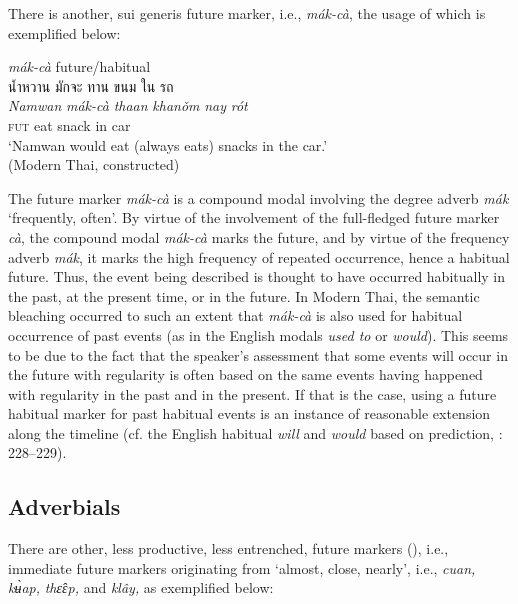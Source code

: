 \documentclass[output=paper,colorlinks,citecolor=brown]{langscibook}
\begin{document}
There is another, sui generis future marker, i.e., \textit{mák-cà}, the usage of which is exemplified below: 

\ea \label{ex:9}
    \textit{mák-cà }future/habitual\\
    \textthai{น้ำหวาน} \textthai{มักจะ} \textthai{ทาน} \textthai{ขนม} \textthai{ใน} \textthai{รถ}\\
    \gll \textit{Namwan} \textit{mák-cà} \textit{thaan} \textit{khanǒm} \textit{nay} \textit{rót}\\
    [name] \textsc{fut} eat snack in car\\
    \glt ‘Namwan would eat (always eats) snacks in the car.’ \\
    \hfill (Modern Thai, constructed)
\z

The future marker \textit{mák-cà} is a compound modal involving the degree adverb \textit{mák} ‘frequently, often’. By virtue of the involvement of the full-fledged future marker \textit{cà}, the compound modal \textit{mák-cà} marks the future, and by virtue of the frequency adverb \textit{mák}, it marks the high frequency of repeated occurrence, hence a habitual future. Thus, the event being described is thought to have occurred habitually in the past, at the present time, or in the future. In Modern Thai, the semantic bleaching occurred to such an extent that \textit{mák-cà} is also used for habitual occurrence of past events (as in the English modals \textit{used to }or \textit{would}). This seems to be due to the fact that the speaker’s assessment that some events will occur in the future with regularity is often based on the same events having happened with regularity in the past and in the present. If that is the case, using a future habitual marker for past habitual events is an instance of reasonable extension along the timeline (cf. the English habitual \textit{will} and \textit{would }based on prediction, \cite{QuirkEtAl1985}: 228--229). 

\largerpage[0.5]

\subsection{Adverbials}\label{sec:khammee:2.3}

There are other, less productive, less entrenched, future markers (\cite{Supanvanich1973}), i.e., immediate future markers originating from ‘almost, close, nearly’, i.e., \textit{cuan}\textit{, }\textit{kʉ̀ap}\textit{, }\textit{thɛ̂ɛp}\textit{, }and \textit{klây}\textit{, }as exemplified below:
\end{document}
